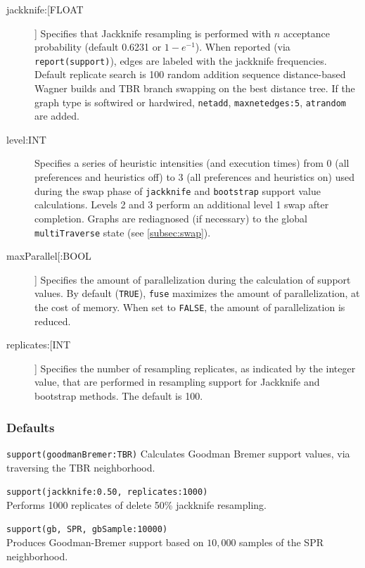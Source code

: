 \begin{description}
		\item[jackknife:[FLOAT]] Specifies that Jackknife resampling is performed with $n$ 
		acceptance probability (default 0.6231 or $1 - e^{-1}$). When reported (via 
		\texttt{report(support)}), edges are labeled with the jackknife frequencies. Default 
		replicate search is 100 random addition sequence distance-based Wagner builds 
		and TBR branch swapping on the best distance tree. If the graph type is softwired 
		or hardwired, \texttt{netadd}, \texttt{maxnetedges:5}, \texttt{atrandom} are added. 
		
		   \item[level:INT] Specifies a series of heuristic intensities (and execution times) from 
		   0 (all preferences and heuristics off) to 3 (all preferences and heuristics on) used 
		   during the swap phase of \texttt{jackknife} and \texttt{bootstrap} support value 
		   calculations. Levels 2 and 3 perform an additional level 1 swap after completion. 
		   Graphs are rediagnosed (if necessary) to the global \texttt{multiTraverse} state
		   (see \ref{subsec:swap}).
		
		   \item[maxParallel[:BOOL]] Specifies the amount of parallelization during the 
		   calculation of support values. By default (\texttt{TRUE}), \texttt{fuse} maximizes 
		   	the amount of parallelization, at the cost of memory. When set to \texttt{FALSE}, 
			the amount of parallelization is reduced. 

		\item[replicates:[INT]] Specifies the number of resampling replicates, as indicated 
	          by the integer value, that are performed in resampling support for Jackknife and 
	          bootstrap methods. The default is 100.
		
	\end{description}	
		
	\subsubsection{Defaults}
		\texttt{support(goodmanBremer:TBR)} Calculates Goodman Bremer support values, 
		via traversing the TBR neighborhood.
		
		\begin{example}
		
			\item{\texttt{support(jackknife:0.50, replicates:1000)}\\Performs 1000 replicates of 
			delete 50\% jackknife resampling.}
				
			\item{\texttt{support(gb, SPR, gbSample:10000)}\\Produces Goodman-Bremer 
			support based on $10,000$ samples of the SPR neighborhood.}
			
		\end{example}

